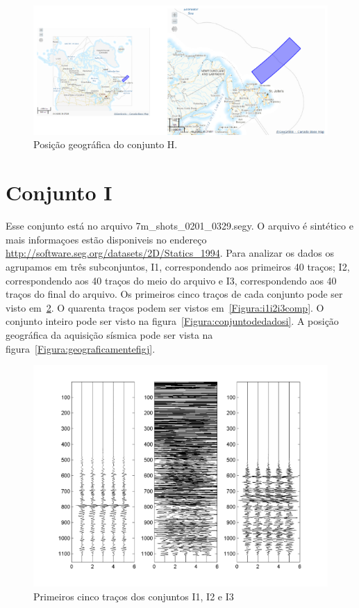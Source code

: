 \begin{figure}[ht]
\centering
\includegraphics[scale=0.75]{fig/gps_img_h.png}
\caption[Posição do conjunto H]{Posição geográfica do conjunto H.}
\label{Figura:geograficamentefigh}
\end{figure}

\section{Conjunto I}

Esse conjunto está no arquivo 7m\_shots\_0201\_0329.segy. O arquivo é sintético
e mais informaçoes estão disponiveis no endereço
\url{http://software.seg.org/datasets/2D/Statics_1994}. Para analizar os dados
os agrupamos em três subconjuntos, I1, correspondendo aos primeiros 40 traços;
I2, correspondendo aos 40 traços do meio do arquivo e I3, correspondendo aos 40
traços do final do arquivo. Os primeiros cinco traços de cada conjunto pode ser
visto em~\ref{Figura:i1i2i3}. O quarenta traços podem ser vistos
em~\ref{Figura:i1i2i3comp}. O conjunto inteiro pode ser visto na
figura~\ref{Figura:conjuntodedadosi}. A posição geográfica da aquisição sísmica
pode ser vista na figura~\ref{Figura:geograficamentefigj}.

\begin{figure}[!h]
\centering
  \includegraphics[scale=1.01]{fig/fig_I1.png}
  \caption{Primeiros cinco traços dos conjuntos I1, I2 e I3}
  \label{Figura:i1i2i3}
\end{figure}

